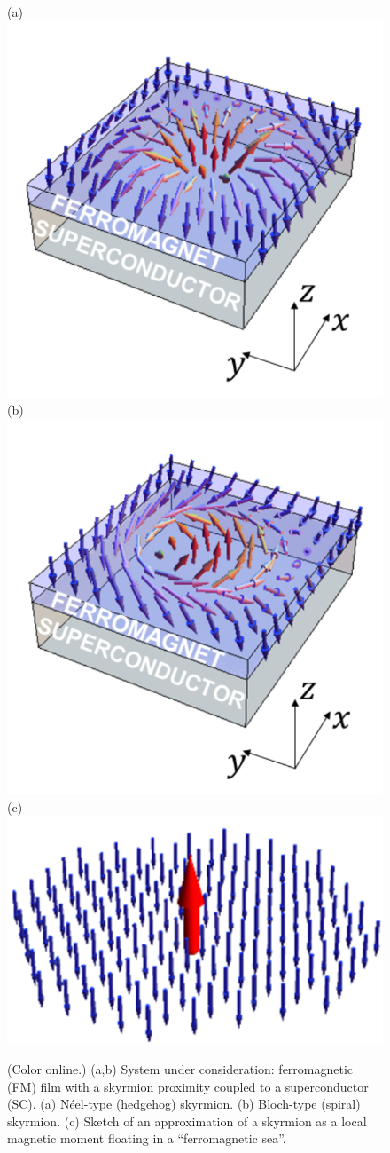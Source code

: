 \documentclass[twocolumn,showpacs,floatfix,longbibliography]{revtex4-1}
\begin{document}
\begin{figure} \centering
(a) \includegraphics[width=0.4\linewidth]{SkyrmA}
(b) \includegraphics[width=0.4\linewidth]{SkyrmB} \\
(c) \includegraphics[width=0.4\linewidth]{fig1c}
\caption{(Color online.) (a,b) System under consideration: ferromagnetic (FM) film with a skyrmion proximity coupled to a superconductor (SC). (a) N\'eel-type (hedgehog) skyrmion.  (b) Bloch-type (spiral) skyrmion. (c) Sketch of an approximation of a skyrmion as a local magnetic moment floating in a ``ferromagnetic sea''.} \label{fig:skyrmion}
\end{figure}
\end{document}
